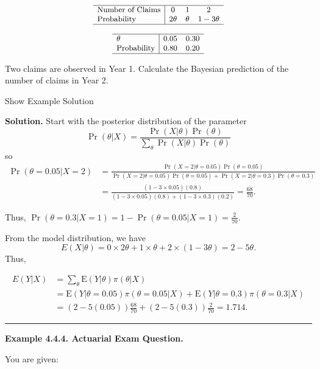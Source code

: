 \documentclass[]{book}
\theoremstyle{definition}
\theoremstyle{definition}
\theoremstyle{definition}
\theoremstyle{remark}
\begin{document}
\[
{\small
\begin{array}{l|ccc}
\hline
\text{Number of Claims} & 0 & 1 & 2 \\
\text{Probability} & 2\theta & \theta & 1-3\theta \\
\hline
\end{array}
}
\]

\[
{\small
\begin{array}{l|cc}
\hline
\theta & 0.05 & 0.30 \\
\text{Probability} & 0.80 & 0.20 \\
\hline
\end{array}
}
\]

Two claims are observed in Year 1. Calculate the Bayesian prediction of
the number of claims in Year 2.

Show Example Solution

\hypertarget{toggleExampleSelect.4.3}{}
\textbf{Solution.} Start with the posterior distribution of the
parameter \[
\Pr(\theta|X) = \frac{\Pr(X|\theta)\Pr(\theta)}{\sum_{\theta}\Pr(X|\theta)\Pr(\theta)}
\] so \[
\begin{aligned} 
\Pr(\theta=0.05|X=2) &= \frac{\Pr(X=2|\theta=0.05)\Pr(\theta=0.05)}
{\Pr(X=2|\theta=0.05)\Pr(\theta=0.05)+\Pr(X=2|\theta=0.3)\Pr(\theta=0.3)}\\
&=\frac{(1-3\times 0.05)(0.8)}{(1-3\times 0.05)(0.8)+(1-3\times 0.3)(0.2)}= \frac{68}{70}.
\end{aligned} 
\]

Thus, \(\Pr(\theta=0.3|X=1)= 1 - \Pr(\theta=0.05|X=1) = \frac{2}{70}\).

From the model distribution, we have \[
E(X|\theta) = 0 \times 2\theta + 1 \times \theta + 2 \times (1-3\theta) = 2 - 5 \theta.
\] Thus,

\[
\begin{aligned}
E(Y|X)
&=   \sum_{\theta}  \mathrm{E}(Y|\theta) \pi(\theta|X) \\
&= \mathrm{E}(Y|\theta=0.05) \pi(\theta=0.05|X)+\mathrm{E}(Y|\theta=0.3) \pi(\theta=0.3|X)\\
&= ( 2 - 5 (0.05))\frac{68}{70} + ( 2 - 5 (0.3))\frac{2}{70} = 1.714.
\end{aligned}
\]

\begin{center}\rule{0.5\linewidth}{\linethickness}\end{center}

\textbf{Example 4.4.4. Actuarial Exam Question.}

You are given:
\end{document}
